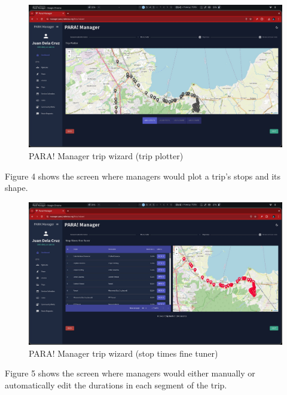 \documentclass[journal]{./IEEE/IEEEtran}
\begin{document}
\begin{description}
\begin{figure}[!h]
    \centering
        \includegraphics[scale=0.115]{./figures/manager/trip wizard 2.jpeg}
    \caption{PARA! Manager trip wizard (trip plotter)}
\end{figure}

Figure 4 shows the screen where managers would plot a trip's stops and its shape.

\begin{figure}[!h]
    \centering
        \includegraphics[scale=0.115]{./figures/manager/trip wizard 3.jpeg}
    \caption{PARA! Manager trip wizard (stop times fine tuner)}
\end{figure}

Figure 5 shows the screen where managers would either manually or automatically edit the durations in each segment of the trip. 


\end{description}
\end{document}

